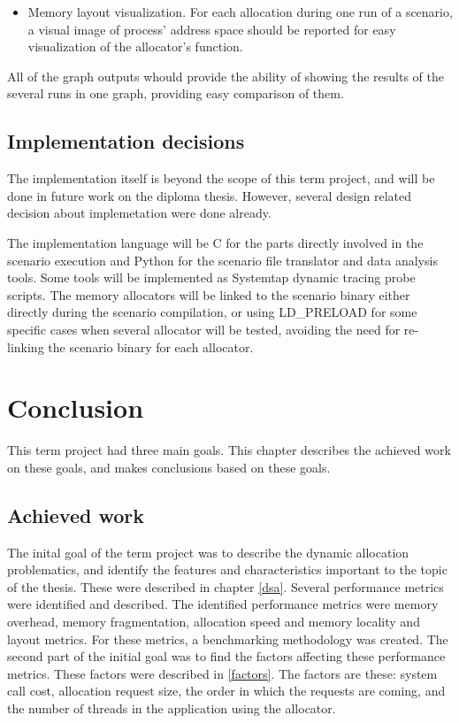 \begin{itemize}
\item Memory layout visualization. For each allocation during one run of a scenario, a visual image of process' address space should be reported for easy visualization of the allocator's function.  
\end{itemize}

All of the graph outputs whould provide the ability of showing the results of the several runs in one graph, providing easy comparison of them.

\section{Implementation decisions}
The implementation itself is beyond the scope of this term project, and will be done in future work on the diploma thesis. However, several design related decision about implemetation were done already.

The implementation language will be C for the parts directly involved in the scenario execution and Python for the scenario file translator and data analysis tools. Some tools will be implemented as Systemtap dynamic tracing probe scripts. The memory allocators will be linked to the scenario binary either directly during the scenario compilation, or using LD\_PRELOAD for some specific cases when several allocator will be tested, avoiding the need for re-linking the scenario binary for each allocator. 

\chapter{Conclusion}

This term project had three main goals. This chapter describes the achieved work on these goals, and makes conclusions based on these goals.

\section{Achieved work}

The inital goal of the term project was to describe the dynamic allocation problematics, and identify the features and characteristics important to the topic of the thesis. These were described in chapter \ref{dsa}. Several performance metrics were identified and described. The identified performance metrics were memory overhead, memory fragmentation, allocation speed and memory locality and layout metrics. For these metrics, a benchmarking methodology was created. The second part of the initial goal was to find the factors affecting these performance metrics. These factors were described in \ref{factors}. The factors are these: system call cost, allocation request size, the order in which the requests are coming, and the number of threads in the application using the allocator.

